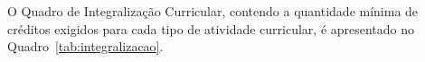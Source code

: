 
O Quadro de Integralização Curricular, contendo a quantidade mínima de créditos exigidos para cada tipo de atividade curricular, é apresentado no Quadro~\ref{tab:integralizacao}.

